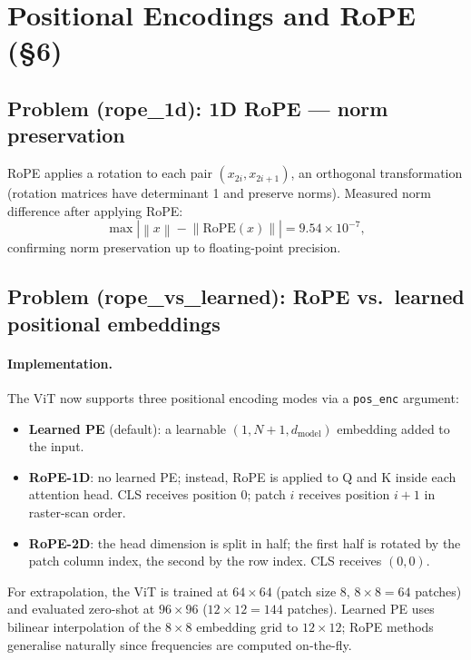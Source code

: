 \documentclass[11pt]{article}
\newcommand{\norm}[1]{\left\|#1\right\|}
\begin{document}
\section{Positional Encodings and RoPE (\S6)}

\subsection*{Problem (rope\_1d): 1D RoPE --- norm preservation}

RoPE applies a rotation to each pair $(x_{2i}, x_{2i+1})$, an orthogonal transformation (rotation matrices have determinant 1 and preserve norms). Measured norm difference after applying RoPE:
\[
\max \left|\norm{x} - \norm{\mathrm{RoPE}(x)}\right| = 9.54 \times 10^{-7},
\]
confirming norm preservation up to floating-point precision.

\subsection*{Problem (rope\_vs\_learned): RoPE vs.\ learned positional embeddings}

\paragraph{Implementation.}
The ViT now supports three positional encoding modes via a \texttt{pos\_enc} argument:
\begin{itemize}
  \item \textbf{Learned PE} (default): a learnable $(1, N{+}1, d_{\mathrm{model}})$ embedding added to the input.
  \item \textbf{RoPE-1D}: no learned PE; instead, RoPE is applied to Q and K inside each attention head. CLS receives position 0; patch $i$ receives position $i{+}1$ in raster-scan order.
  \item \textbf{RoPE-2D}: the head dimension is split in half; the first half is rotated by the patch column index, the second by the row index. CLS receives $(0, 0)$.
\end{itemize}
For extrapolation, the ViT is trained at $64{\times}64$ (patch size 8, $8{\times}8 = 64$ patches) and evaluated zero-shot at $96{\times}96$ ($12{\times}12 = 144$ patches). Learned PE uses bilinear interpolation of the $8{\times}8$ embedding grid to $12{\times}12$; RoPE methods generalise naturally since frequencies are computed on-the-fly.
\end{document}
